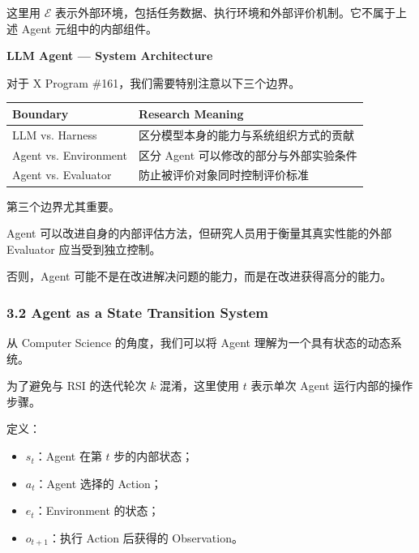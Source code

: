 这里用 \(\mathcal E\) 表示外部环境，包括任务数据、执行环境和外部评价机制。它不属于上述 Agent 元组中的内部组件。

\textbf{LLM Agent --- System Architecture}


对于 X Program \#161，我们需要特别注意以下三个边界。

\begin{readertable}
\begin{longtable}[]{@{}
  >{\raggedright\arraybackslash}p{}
  >{\raggedright\arraybackslash}p{}@{}}
\toprule
Boundary & Research Meaning \\
\midrule
\endhead
LLM vs. Harness & 区分模型本身的能力与系统组织方式的贡献 \\
Agent vs. Environment & 区分 Agent 可以修改的部分与外部实验条件 \\
Agent vs. Evaluator & 防止被评价对象同时控制评价标准 \\
\bottomrule
\end{longtable}
\end{readertable}

第三个边界尤其重要。

Agent 可以改进自身的内部评估方法，但研究人员用于衡量其真实性能的外部 Evaluator 应当受到独立控制。

否则，Agent 可能不是在改进解决问题的能力，而是在改进获得高分的能力。

\hypertarget{part-3-31-0001-agent-as-a-state-transition-system}{%
\subsubsection{3.2 Agent as a State Transition System}\label{part-3-31-0001-agent-as-a-state-transition-system}}

从 Computer Science 的角度，我们可以将 Agent 理解为一个具有状态的动态系统。

为了避免与 RSI 的迭代轮次 \(k\) 混淆，这里使用 \(t\) 表示单次 Agent 运行内部的操作步骤。

定义：

\begin{itemize}
\tightlist
\item
  \(s_t\)：Agent 在第 \(t\) 步的内部状态；
\item
  \(a_t\)：Agent 选择的 Action；
\item
  \(e_t\)：Environment 的状态；
\item
  \(o_{t+1}\)：执行 Action 后获得的 Observation。
\end{itemize}

